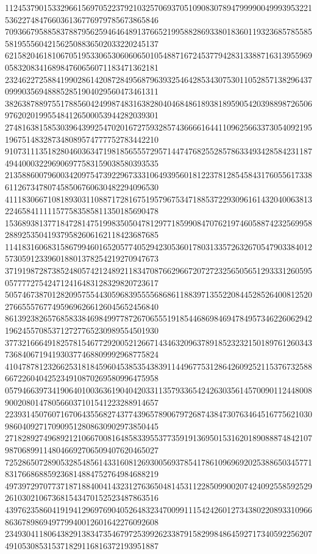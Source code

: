 \begin{DoxyCode}
      112453790153329661569705223792103257069370510908307894799990049993953221536227484766036136776979785673865846
      709366795885837887956259464648913766521995882869338018360119323685785585581955560421562508836502033220245137
      621582046181067051953306530606065010548871672453779428313388716313955969058320834168984760656071183471362181
      232462272588419902861420872849568796393254642853430753011052857138296437099903569488852851904029560473461311
      382638788975517885604249987483163828040468486189381895905420398898726506976202019955484126500053944282039301
      274816381585303964399254702016727593285743666616441109625663373054092195196751483287348089574777752783442210
      910731113518280460363471981856555729571447476825528578633493428584231187494400032296906977583159038580393535
      213588600796003420975473922967333106493956018122378128545843176055617338611267347807458506760630482294096530
      411183066710818930311088717281675195796753471885372293096161432040063813224658411111577583585811350185690478
      153689381377184728147519983505047812977185990847076219746058874232569958288925350419379582606162118423687685
      114183160683158679946016520577405294230536017803133572632670547903384012573059123396018801378254219270947673
      371919872873852480574212489211834708766296672072723256505651293331260595057777275424712416483128329820723617
      505746738701282095755443059683955556868611883971355220844528526400812520276655576774959696266126045652456840
      861392382657685833846984997787267065551918544686984694784957346226062942196245570853712727765230989554501930
      377321666491825781546772920052126671434632096378918523232150189761260343736840671941930377468809992968775824
      410478781232662531818459604538535438391144967753128642609252115376732588667226040425234910870269580996475958
      057946639734190640100363619040420331135793365424263035614570090112448008900208014780566037101541223288914657
      223931450760716706435568274377439657890679726874384730763464516775621030986040927170909512808630902973850445
      271828927496892121066700816485833955377359191369501531620189088874842107987068991148046692706509407620465027
      725286507289053285485614331608126930056937854178610969692025388650345771831766868859236814884752764984688219
      497397297077371871884004143231276365048145311228509900207424092558592529261030210673681543470152523487863516
      439762358604191941296976904052648323470099111542426012734380220893310966863678986949779940012601642276092608
      234930411806438291383473546797253992623387915829984864592717340592256207491053085315371829116816372193951887

\end{DoxyCode}
